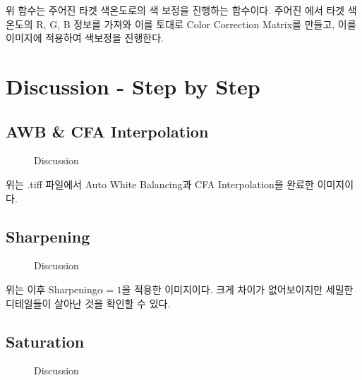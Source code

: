 \documentclass{report}
\begin{document}
위 함수는 주어진 타겟 색온도로의 색 보정을 진행하는 함수이다.
주어진 에서 타겟 색온도의 R, G, B 정보를
가져와 이를 토대로 Color Correction Matrix를 만들고, 이를
이미지에 적용하여 색보정을 진행한다.

\section*{Discussion - Step by Step}

\subsection*{AWB \& CFA Interpolation}

\begin{figure}[htbp]
    \centering


    \caption{Discussion}
\end{figure}

위는 .tiff 파일에서 Auto White Balancing과 CFA Interpolation을 완료한 이미지이다.

\subsection*{Sharpening}

\begin{figure}[htbp]
    \centering


    \caption{Discussion}
\end{figure}

위는 이후 Sharpening\(\alpha = 1\)을 적용한 이미지이다.
크게 차이가 없어보이지만 세밀한 디테일들이 살아난 것을 확인할 수 있다.

\subsection*{Saturation}

\begin{figure}[htbp]
    \centering


    \caption{Discussion}
\end{figure}
\end{document}
